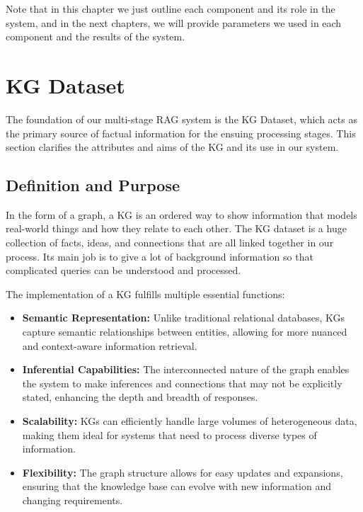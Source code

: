 Note that in this chapter we just outline each component and its role in the system, and in the next chapters, we will provide parameters we used in each component and the results of the system.

\section{KG Dataset}\label{sec:knowledge-graph-dataset}
The foundation of our multi-stage RAG system is the \ac{KG} Dataset, which acts as the primary source of factual information for the ensuing processing stages.
This section clarifies the attributes and aims of the \ac{KG} and its use in our system.

\subsection{Definition and Purpose}\label{subsec:definition-and-purpose}
In the form of a graph, a \ac{KG} is an ordered way to show information that models real-world things and how they relate to each other.
The \ac{KG} dataset is a huge collection of facts, ideas, and connections that are all linked together in our process.
Its main job is to give a lot of background information so that complicated queries can be understood and processed.

The implementation of a \ac{KG} fulfills multiple essential functions:
\begin{itemize}
    \item \textbf{Semantic Representation:} Unlike traditional relational databases, \acp{KG} capture semantic relationships between entities, allowing for more nuanced and context-aware information retrieval.
    \item \textbf{Inferential Capabilities:} The interconnected nature of the graph enables the system to make inferences and connections that may not be explicitly stated, enhancing the depth and breadth of responses.
    \item \textbf{Scalability:} \acp{KG} can efficiently handle large volumes of heterogeneous data, making them ideal for systems that need to process diverse types of information.
    \item \textbf{Flexibility:} The graph structure allows for easy updates and expansions, ensuring that the knowledge base can evolve with new information and changing requirements.
\end{itemize}

